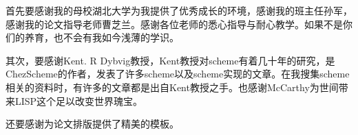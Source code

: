 \begin{acknowledgement}
%
首先要感谢我的母校湖北大学为我提供了优秀成长的环境，感谢我的班主任孙军，感谢我的论文指导老师曹芝兰。感谢各位老师的悉心指导与耐心教学。如果不是你们的养育，也不会有我如今浅薄的学识。

其次，要感谢Kent. R Dybvig教授，Kent教授对scheme有着几十年的研究，是ChezScheme的作者，发表了许多scheme以及scheme实现的文章。在我搜集scheme相关的资料时，有许多的文章都是出自Kent教授之手。也感谢McCarthy为世间带来LISP这个足以改变世界瑰宝。

还要感谢\thuthesis 为论文排版提供了精美的模板。
\end{acknowledgement}